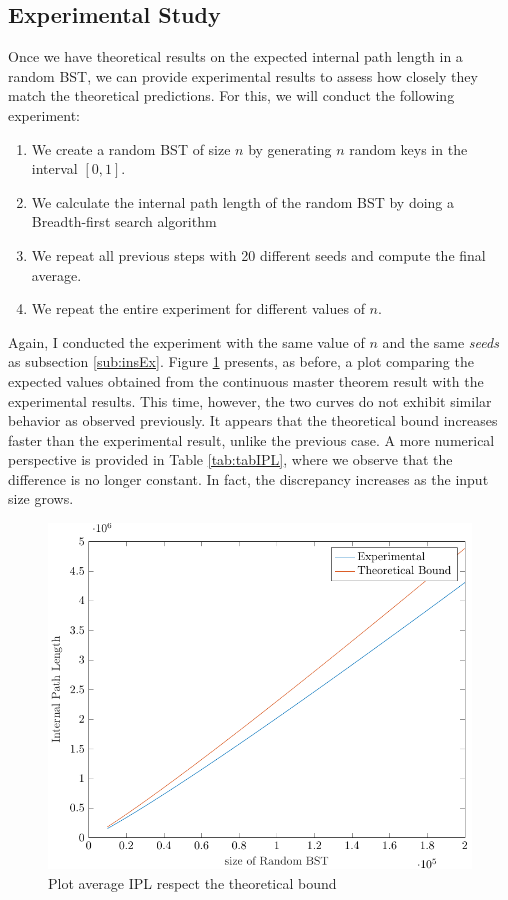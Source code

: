 \subsection{Experimental Study}
Once we have theoretical results on the expected internal path length in a random BST, we can provide experimental results to assess how closely they match the theoretical predictions. For this, we will conduct the following experiment:

\begin{enumerate}
    \item We create a random BST of size \( n \) by generating \( n \) random keys in the interval \( [0,1] \).
    \item We calculate the internal path length of the random BST by doing a Breadth-first search algorithm
    \item We repeat all previous steps with 20 different seeds and compute the final average.
    \item We repeat the entire experiment for different values of \( n \).
\end{enumerate}

Again, I conducted the experiment with the same value of $n$ and the same \textit{seeds} as subsection \ref{sub:insEx}. Figure \ref{fig:plotBoundIPL} presents, as before, a plot comparing the expected values obtained from the continuous master theorem result with the experimental results. This time, however, the two curves do not exhibit similar behavior as observed previously. It appears that the theoretical bound increases faster than the experimental result, unlike the previous case. A more numerical perspective is provided in Table \ref{tab:tabIPL}, where we observe that the difference is no longer constant. In fact, the discrepancy increases as the input size grows.

\begin{figure}[ht]
    \centering
    \includegraphics[scale=0.65]{plotIPL.pdf}
    \caption{Plot average IPL respect the theoretical bound}
    \label{fig:plotBoundIPL}
\end{figure}

